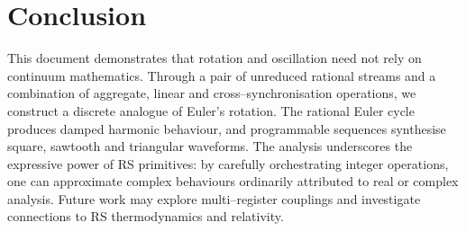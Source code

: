 \documentclass[11pt, letterpaper]{article}
\theoremstyle{definition}
\theoremstyle{plain}
\begin{document}
\section{Conclusion}

This document demonstrates that rotation and oscillation need not rely on
continuum mathematics.  Through a pair of unreduced rational streams and a
combination of aggregate, linear and cross–synchronisation operations, we
construct a discrete analogue of Euler's rotation.  The rational Euler cycle
produces damped harmonic behaviour, and programmable sequences synthesise
square, sawtooth and triangular waveforms.  The analysis underscores the
expressive power of RS primitives: by carefully orchestrating integer
operations, one can approximate complex behaviours ordinarily attributed to
real or complex analysis.  Future work may explore multi–register couplings
and investigate connections to RS thermodynamics and relativity.
\end{document}
